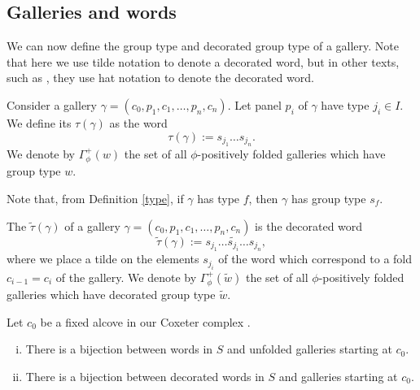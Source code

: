 \documentclass[11pt]{article}
\begin{document}

\subsection{Galleries and words}

We can now define the group type and decorated group type of a gallery. Note that here we use tilde notation to denote a decorated word, but in other texts, such as \cite{SHA}, they use hat notation to denote the decorated word.

\begin{definition}
    Consider a gallery $\gamma = (c_0,p_1,c_1,\hdots ,p_n,c_n)$. Let panel $p_i$ of $\gamma$ have type ${j_i}\in I$. We define its  $\tau(\gamma)$ as the word 
    \[\tau(\gamma):=s_{j_1}\hdots s_{j_n}.\]
    We denote by $\Gamma_{\phi}^+(w)$ the set of all $\phi$-positively folded galleries which have group type $w$. 
\end{definition}

Note that, from Definition \ref{type}, if $\gamma$ has type $f$, then $\gamma$ has group type $s_f$. 

\begin{definition}
    The  $\tilde\tau(\gamma)$ of a gallery $\gamma = (c_0,p_1,c_1,\hdots ,p_n,c_n)$ is the decorated word
    \[\tilde\tau(\gamma):= s_{j_1}\hdots \tilde{s_{j_i}}\hdots s_{j_n},\]
    where we place a tilde on the elements $s_{j_i}$ of the word which correspond to a fold $c_{i-1}=c_i$ of the gallery. We denote by $\Gamma_{\phi}^+(\tilde{w})$ the set of all $\phi$-positively folded galleries which have decorated group type $\tilde{w}$.
\end{definition}


\begin{lemma}\cite[p.128]{SHA}
    Let $c_0$ be a fixed alcove in our Coxeter complex \sg. 
    \begin{enumerate}[(i)]
        \item There is a bijection between words in $S$ and unfolded galleries starting at $c_0$.
        \item There is a bijection between decorated words in $S$ and galleries starting at $c_0$. 
    \end{enumerate}
\end{lemma}
\end{document}

